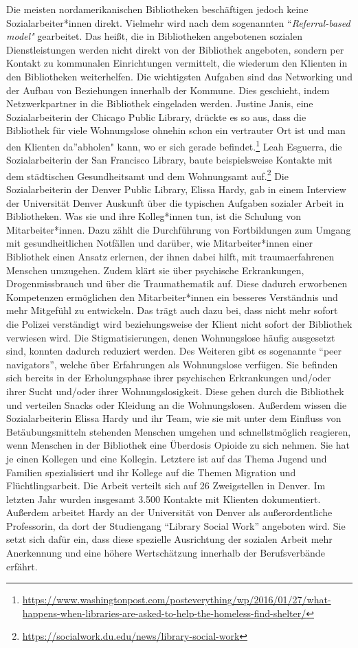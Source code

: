 \documentclass[a4paper,
fontsize=11pt,
oneside,
numbers=noperiodatend,
parskip=half-,
bibliography=totoc,
final
]{scrartcl}
\begin{document}
Die meisten nordamerikanischen Bibliotheken beschäftigen jedoch keine
Sozialarbeiter*innen direkt. Vielmehr wird nach dem sogenannten
\enquote{\emph{Referral-based model"} gearbeitet. Das heißt, die in
Bibliotheken angebotenen sozialen Dienstleistungen werden nicht direkt
von der Bibliothek angeboten, sondern per Kontakt zu kommunalen
Einrichtungen vermittelt, die wiederum den Klienten in den Bibliotheken
weiterhelfen. Die wichtigsten Aufgaben sind das Networking und der
Aufbau von Beziehungen innerhalb der Kommune. Dies geschieht, indem
Netzwerkpartner in die Bibliothek eingeladen werden. Justine Janis, eine
Sozialarbeiterin der Chicago Public Library, drückte es so aus, dass die
Bibliothek für viele Wohnungslose ohnehin schon ein vertrauter Ort ist
und man den Klienten da}abholen" kann, wo er sich gerade
befindet.\footnote{\url{https://www.washingtonpost.com/posteverything/wp/2016/01/27/what-happens-when-libraries-are-asked-to-help-the-homeless-find-shelter/}}
Leah Esguerra, die Sozialarbeiterin der San Francisco Library, baute
beispielsweise Kontakte mit dem städtischen Gesundheitsamt und dem
Wohnungsamt auf.\footnote{\url{https://socialwork.du.edu/news/library-social-work}}
Die Sozialarbeiterin der Denver Public Library, Elissa Hardy, gab in
einem Interview der Universität Denver Auskunft über die typischen
Aufgaben sozialer Arbeit in Bibliotheken. Was sie und ihre Kolleg*innen
tun, ist die Schulung von Mitarbeiter*innen. Dazu zählt die Durchführung
von Fortbildungen zum Umgang mit gesundheitlichen Notfällen und darüber,
wie Mitarbeiter*innen einer Bibliothek einen Ansatz erlernen, der ihnen
dabei hilft, mit traumaerfahrenen Menschen umzugehen. Zudem klärt sie
über psychische Erkrankungen, Drogenmissbrauch und über die
Traumathematik auf. Diese dadurch erworbenen Kompetenzen ermöglichen den
Mitarbeiter*innen ein besseres Verständnis und mehr Mitgefühl zu
entwickeln. Das trägt auch dazu bei, dass nicht mehr sofort die Polizei
verständigt wird beziehungsweise der Klient nicht sofort der Bibliothek
verwiesen wird. Die Stigmatisierungen, denen Wohnungslose häufig
ausgesetzt sind, konnten dadurch reduziert werden. Des Weiteren gibt es
sogenannte \enquote{peer navigators}, welche über Erfahrungen als
Wohnungslose verfügen. Sie befinden sich bereits in der Erholungsphase
ihrer psychischen Erkrankungen und/oder ihrer Sucht und/oder ihrer
Wohnungslosigkeit. Diese gehen durch die Bibliothek und verteilen Snacks
oder Kleidung an die Wohnungslosen. Außerdem wissen die Sozialarbeiterin
Elissa Hardy und ihr Team, wie sie mit unter dem Einfluss von
Betäubungsmitteln stehenden Menschen umgehen und schnellstmöglich
reagieren, wenn Menschen in der Bibliothek eine Überdosis Opioide zu
sich nehmen. Sie hat je einen Kollegen und eine Kollegin. Letztere ist
auf das Thema Jugend und Familien spezialisiert und ihr Kollege auf die
Themen Migration und Flüchtlingsarbeit. Die Arbeit verteilt sich auf 26
Zweigstellen in Denver. Im letzten Jahr wurden insgesamt 3.500 Kontakte
mit Klienten dokumentiert. Außerdem arbeitet Hardy an der Universität
von Denver als außerordentliche Professorin, da dort der Studiengang
\enquote{Library Social Work} angeboten wird. Sie setzt sich dafür ein,
dass diese spezielle Ausrichtung der sozialen Arbeit mehr Anerkennung
und eine höhere Wertschätzung innerhalb der Berufsverbände erfährt.
\end{document}
